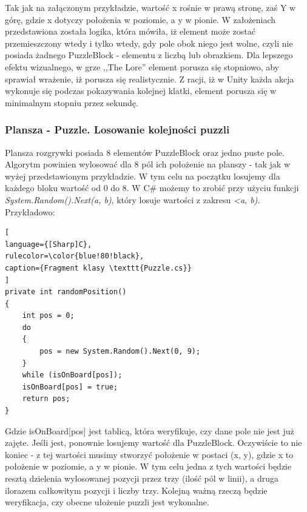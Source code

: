 \documentclass[oneside,polski,logo]{amuthesis}
\begin{document}
Tak jak na załączonym przykładzie, wartość x rośnie w prawą stronę, zaś Y w górę, gdzie x dotyczy położenia w poziomie, a y w pionie. W założeniach przedstawiona została logika, która mówiła, iż element może zostać przemieszczony wtedy i tylko wtedy, gdy pole obok niego jest wolne, czyli nie posiada żadnego PuzzleBlock - elementu z liczbą lub obrazkiem. Dla lepszego efektu wizualnego, w grze ,,The Lore'' element porusza się stopniowo, aby sprawiał wrażenie, iż porusza się realistycznie. Z racji, iż w Unity każda akcja wykonuje się podczas pokazywania kolejnej klatki, element porusza się w minimalnym stopniu przez sekundę. 

\subsubsection{Plansza - Puzzle. Losowanie kolejności puzzli}
\par Plansza rozgrywki posiada 8 elementów PuzzleBlock oraz jedno puste pole.  Algorytm powinien wylosować dla 8 pól ich położenie na planszy - tak jak w wyżej przedstawionym przykładzie. W tym celu na początku losujemy dla każdego bloku wartość od 0 do 8. W C\# możemy to zrobić przy użyciu funkcji  \emph{System.Random().Next(a, b)}, który losuje wartości z zakresu \emph{<a, b)}. Przykładowo:
\begin{lstlisting}[
language={[Sharp]C},
rulecolor=\color{blue!80!black},
caption={Fragment klasy \texttt{Puzzle.cs}}
]
private int randomPosition()
{
    int pos = 0;
    do
    {
        pos = new System.Random().Next(0, 9);
    }
    while (isOnBoard[pos]);
    isOnBoard[pos] = true;
    return pos;
}
\end{lstlisting}

Gdzie isOnBoard[pos] jest tablicą, która weryfikuje, czy dane pole nie jest już zajęte. Jeśli jest, ponownie losujemy wartość dla PuzzleBlock. Oczywiście to nie koniec - z tej wartości musimy stworzyć położenie w postaci (x, y), gdzie x to położenie w poziomie, a y w pionie. W tym celu jedna z tych wartości będzie resztą dzielenia wylosowanej pozycji przez trzy (ilość pól w linii), a druga ilorazem całkowitym pozycji i liczby trzy. 
Kolejną ważną rzeczą będzie weryfikacja, czy obecne ułożenie puzzli jest wykonalne.
\end{document}
